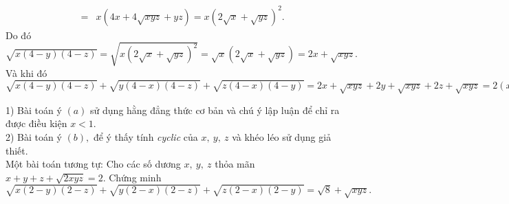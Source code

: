\begin{ex}
{\begin{eqnarray*}
		&=&x(4x+4\sqrt{xyz}+yz)=x\left(2\sqrt{x}+\sqrt{yz}\right)^2.\end{eqnarray*}
		Do đó
		$\sqrt{x(4-y)(4-z)}=\sqrt{x\left(2\sqrt{x}+\sqrt{yz}\right)^2}=\sqrt{x}(2\sqrt{x}+\sqrt{yz})=2x+\sqrt{xyz}.$\\
		Và khi đó $\sqrt{x(4-y)(4-z)}+\sqrt{y(4-x)(4-z)}+\sqrt{z(4-x)(4-y)}=2x+\sqrt{xyz}+2y+\sqrt{xyz}+2z+\sqrt{xyz}=2(x+y+z)+3\sqrt{xyz}=8+\sqrt{xyz}.$
		\begin{nx}
			1) Bài toán ý $(a)$ sử dụng hằng đẳng thức cơ bản và chú ý lập luận để chỉ ra được điều kiện $x<1.$\\
			2) Bài toán ý $(b),$ để ý thấy tính {\it cyclic } của $x,\ y,\ z$ và khéo léo sử dụng giả thiết.\\
			 Một bài toán tương tự: Cho các số dương $x,\ y,\ z$ thỏa mãn $x+y+z+\sqrt{2xyz}=2.$ Chứng minh $\sqrt{x(2-y)(2-z)}+\sqrt{y(2-x)(2-z)}+\sqrt{z(2-x)(2-y)}=\sqrt{8}+\sqrt{xyz}.$
		\end{nx}
	}
\end{ex}
